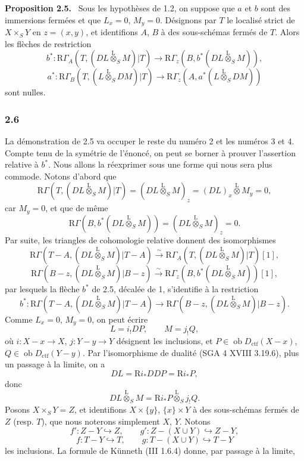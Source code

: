 \documentclass[11pt]{article}
\newenvironment{statement}[1]{\par\medskip\noindent\textbf{#1.}\ }{\par\medskip}
\newcommand{\R}{\mathrm{R}}\newcommand{\RHomCore}{\mathrm{RHom}}
\providecommand{\lten}{\overset{\mathrm L}{\otimes}}
\providecommand{\Ob}{\operatorname{ob}}
\providecommand{\lten}{\overset{\mathrm L}{\otimes}}
\providecommand{\lten}{\overset{\mathrm L}{\otimes}}
\providecommand{\Ob}{\operatorname{ob}}
\providecommand{\R}{\mathrm R}
\providecommand{\lten}{\overset{\mathrm L}{\otimes}}
\providecommand{\lten}{\overset{\mathrm L}{\otimes}}
\providecommand{\Ob}{\operatorname{Ob}}
\providecommand{\lten}{\overset{\mathrm L}{\otimes}}
\providecommand{\Ob}{\operatorname{ob}}
\providecommand{\Ob}{\operatorname{Ob}}
\providecommand{\lten}{\overset{\mathrm L}{\otimes}}
\begin{document}
\begin{statement}{Proposition 2.5}
Sous les hypothèses de 1.2, on suppose que $a$ et $b$ sont des immersions fermées et que $L_x=0$, $M_y=0$. Désignons par $T$ le localisé strict de $X\times_SY$ en $z=(x,y)$, et identifions $A$, $B$ à des sous-schémas fermés de $T$. Alors les flèches de restriction
\[
b^*:\R\Gamma_A(T,(DL\lten_SM)|T)
 \longrightarrow \R\Gamma_z(B,b^*(DL\lten_SM)),
\]
\[
a^*:\R\Gamma_B(T,(L\lten_SDM)|T)
 \longrightarrow \R\Gamma_z(A,a^*(L\lten_SDM))
\]
sont nulles.
\end{statement}

\subsubsection*{2.6}
La démonstration de 2.5 va occuper le reste du numéro 2 et les numéros 3 et 4. Compte tenu de la symétrie de l'énoncé, on peut se borner à prouver l'assertion relative à $b^*$. Nous allons la réexprimer sous une forme qui nous sera plus commode. Notons d'abord que
\[
\R\Gamma(T,(DL\lten_SM)|T)
 =(DL\lten_SM)_z
 =(DL)_x\lten M_y=0,
\]
car $M_y=0$, et que de même
\[
\R\Gamma(B,b^*(DL\lten_SM))
 =(DL\lten_SM)_z=0.
\]
Par suite, les triangles de cohomologie relative donnent des isomorphismes
\[
\R\Gamma(T-A,(DL\lten_SM)|T-A)
 \xrightarrow{\sim}
\R\Gamma_A(T,(DL\lten_SM)|T)[1],
\]
\[
\R\Gamma(B-z,(DL\lten_SM)|B-z)
 \xrightarrow{\sim}
\R\Gamma_z(B,b^*(DL\lten_SM))[1],
\]
par lesquels la flèche $b^*$ de 2.5, décalée de 1, s'identifie à la restriction
\begin{equation}
b^*:\R\Gamma(T-A,(DL\lten_SM)|T-A)
 \longrightarrow \R\Gamma(B-z,(DL\lten_SM)|B-z).
\tag{2.6.1}
\end{equation}
Comme $L_x=0$, $M_y=0$, on peut écrire
\begin{equation}
L=i_!DP,\qquad M=j_!Q,
\tag{2.6.2}
\end{equation}
où $i:X-x\to X$, $j:Y-y\to Y$ désignent les inclusions, et $P\in\Ob D_{\mathrm{ctf}}(X-x)$, $Q\in\Ob D_{\mathrm{ctf}}(Y-y)$. Par l'isomorphisme de dualité (SGA 4 XVIII 3.19.6), plus un passage à la limite, on a
\[
DL=\R i_*DDP=\R i_*P,
\]
donc
\[
DL\lten_SM=\R i_*P\lten_Sj_!Q.
\]
Posons $X\times_SY=Z$, et identifions $X\times\{y\}$, $\{x\}\times Y$ à des sous-schémas fermés de $Z$ (resp. $T$), que nous noterons simplement $X$, $Y$. Notons
\[
f':Z-Y\hookrightarrow Z,\qquad
g':Z-(X\cup Y)\hookrightarrow Z-Y,
\]
\[
f:T-Y\hookrightarrow T,\qquad
g:T-(X\cup Y)\hookrightarrow T-Y
\]
les inclusions. La formule de Künneth (III 1.6.4) donne, par passage à la limite,
\end{document}
